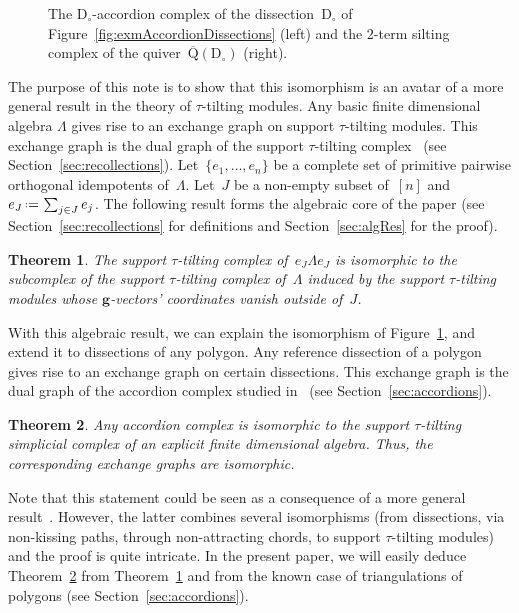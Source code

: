 \documentclass{amsart}
\newtheorem{theorem}{Theorem}%
\theoremstyle{definition}
\renewcommand{\b}[1]{\mathbf{#1}} %
\newcommand{\eqdef}{\mbox{\,\raisebox{0.2ex}{\scriptsize\ensuremath{\mathrm:}}\ensuremath{=}\,}} %
\newcommand{\fref}[1]{Figure~\ref{#1}} %
\newcommand{\dissection}{\mathrm{D}} %
\newcommand{\quiver}{\mathrm{Q}} %
\begin{document}
\begin{figure}
	\capstart
	\centerline{\accordiohedronAccordionTikz{}\hspace{.8cm}\accordiohedronSiltingTikz{}}
	\caption{The $\dissection_\circ$-accordion complex of the dissection~$\dissection_\circ$ of \fref{fig:exmAccordionDissections} (left) and the $2$-term silting complex of the quiver~$\overline{\quiver}(\dissection_\circ)$ (right).}
	\label{fig:accordiohedron}
\end{figure}

The purpose of this note is to show that this isomorphism is an avatar of a more general result in the theory of $\tau$-tilting modules.
Any basic finite dimensional algebra $\Lambda$ gives rise to an exchange graph on support $\tau$-tilting modules. 
This exchange graph is the dual graph of the support $\tau$-tilting complex~\cite{AdachiIyamaReiten} (see Section~\ref{sec:recollections}).
Let~$\{e_1, \dots, e_n\}$ be a complete set of primitive pairwise orthogonal idempotents of~$\Lambda$. 
Let~$J$ be a non-empty subset of~$[n]$ and~$e_J \eqdef \sum_{j \in J} e_j$.
The following result forms the algebraic core of the paper (see Section~\ref{sec:recollections} for definitions and Section~\ref{sec:algRes} for the proof). 

\begin{theorem}
\label{thm:mainAlgThm}
The support $\tau$-tilting complex of~$e_J \Lambda e_J$ is isomorphic to the subcomplex of the support $\tau$-tilting complex of~$\Lambda$ induced by the support $\tau$-tilting modules whose $\b{g}$-vectors' coordinates vanish outside of~$J$.
\end{theorem}

With this algebraic result, we can explain the isomorphism of \fref{fig:accordiohedron}, and extend it to dissections of any polygon.
Any reference dissection of a polygon gives rise to an exchange graph on certain dissections.
This exchange graph is the dual graph of the accordion complex studied in~\cite{Chapoton-quadrangulations, GarverMcConville, MannevillePilaud-accordion} (see Section~\ref{sec:accordions}).

\begin{theorem}
\label{thm:mainDissection}
Any accordion complex is isomorphic to the support $\tau$-tilting simplicial complex of an explicit finite dimensional algebra. Thus, the corresponding exchange graphs are isomorphic.
\end{theorem}

Note that this statement could be seen as a consequence of a more general result~\cite[Prop.~2.44]{PaluPilaudPlamondon}.
However, the latter combines several isomorphisms (from dissections, via non-kissing paths, through non-attracting chords, to support $\tau$-tilting modules) and the proof is quite intricate.
In the present paper, we will easily deduce Theorem~\ref{thm:mainDissection} from Theorem~\ref{thm:mainAlgThm} and from the known case of triangulations of polygons (see Section~\ref{sec:accordions}).
\end{document}
